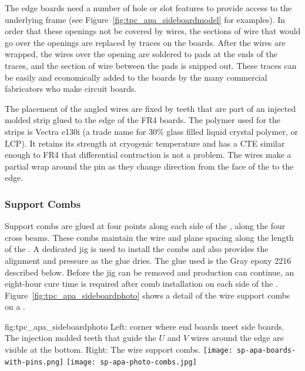 The edge boards need a number of hole or slot features to provide access to the underlying frame (see Figure~\ref{fig:tpc_apa_sideboardmodel} for examples).  In order that these openings not be covered by wires, the sections of wire that would go over the openings are replaced by traces on the boards.  After the wires are wrapped, the wires over the opening are soldered to pads at the ends of the traces, and the section of wire between the pads is snipped out.  These traces can be easily and economically added to the boards by the many commercial fabricators who make circuit boards. 

The placement of the angled wires are fixed by teeth that are part of an injected molded strip glued to the edge of the FR4 boards.  The polymer used for the strips is Vectra e130i (a trade name for 30$\%$ glass filled liquid crystal polymer, or LCP). It retains its strength at cryogenic temperature and has a CTE similar enough to FR4 that differential contraction is not a problem.  The wires make a partial wrap around the pin as they change direction from the face of the  to the edge.

\subsubsection{Support Combs}
\label{sec:combs}

Support combs are glued at four points along each side of the , along the four cross beams. These combs maintain the wire and plane spacing along the length of the . A dedicated jig is used to install the combs and also provides the alignment and pressure as the glue dries. The glue used is the Gray epoxy \num{2216} described below. Before the jig can be removed and production can continue, an eight-hour cure time is required after comb installation on each side of the .  Figure~\ref{fig:tpc_apa_sideboardphoto} shows a detail of the wire support combs on a  .

\begin{dunefigure}{fig:tpc_apa_sideboardphoto}
{Left:  corner where end boards meet side boards.  The injection molded teeth that guide the $U$ and $V$ wires around the edge are visible at the bottom. Right: The wire support combs.}
\texttt{[image: sp-apa-boards-with-pins.png]} \quad
\texttt{[image: sp-apa-photo-combs.jpg]}
\end{dunefigure}

